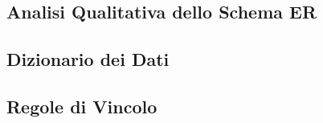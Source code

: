 \documentclass[12pt]{article} %
\begin{document}
		\subsection{Analisi Qualitativa dello Schema ER}

		

    \newpage
    \subsection{Dizionario dei Dati}

    

		\subsection{Regole di Vincolo}

		
\end{document}
